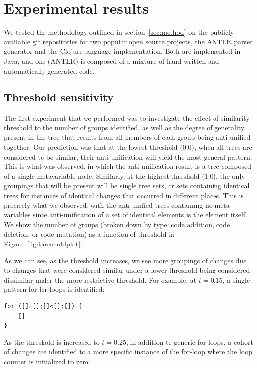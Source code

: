 \section{Experimental results}

We tested the methodology outlined in section~\ref{sec:method} on the
publicly available git repositories for two popular open source
projects, the ANTLR parser generator and the Clojure language implementation.
Both are implemented in Java, and one (ANTLR) is composed of a mixture of
hand-written and automatically generated code.  

\subsection{Threshold sensitivity}

The first experiment that we performed was to investigate the effect of
similarity threshold to the number of groups identified, as well as the degree
of generality present in the tree that results from all members of each group
being anti-unified together. Our prediction was that at the lowest threshold
(0.0), when all trees are considered to be similar, their anti-unification
will yield the most general pattern.  This is what was observed, in which the
anti-unification result is a tree composed of a single metavariable node.
Similarly, at the highest threshold (1.0), the only groupings that will be
present will be single tree sets, or sets containing identical trees for
instances of identical changes that occurred in different places.  This is
precicely what we observed, with the anti-unified trees containing no meta-
variables since anti-unification of a set of identical elements is the element
itself.  We show the number of groups (broken down by type: code addition,
code deletion, or code mutation) as a function of threshold in
Figure~\ref{fig:thresholdplot}.

As we can see, as the threshold increases, we see more groupings of changes
due to changes that were considered similar under a lower threshold being
considered dissimilar under the more restrictive threshold.  For example, at
$t=0.15$, a single pattern for for-loops is identified:

\begin{verbatim}
for ([]=[];[]<[];[]) {
    []
}
\end{verbatim}

As the threshold is increased to $t=0.25$, in addition to generic for-loops, a
cohort of changes are identified to a more specific instance of the for-loop where
the loop counter is initialized to zero:

